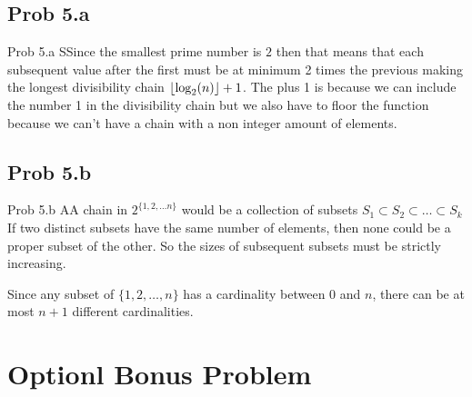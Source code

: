 \documentclass{report}
\begin{document}

\subsection*{Prob 5.a}

\begin{RemarkWithLily}{Prob 5.a }
  SSince the smallest prime number is $2$ then that means that each subsequent value after the first must be at minimum 2 times the previous making the longest divisibility chain 
  $\lfloor\log_{2}(n)\rfloor +1$. The plus 1 is because we can include the number 1 in the divisibility chain but we also have to floor the function because we can't have a chain with a non integer amount of elements.  
\end{RemarkWithLily}

\subsection*{Prob 5.b}

\begin{RemarkWithLily}{Prob 5.b}
  AA chain in $2^{\{1, 2, \ldots n\}}$ would be a collection of subsets $S_{1} \subset S_{2} \subset \ldots \subset  S_{k}$
  If two distinct subsets have the same number of elements, then none could be a proper subset of the other. So the sizes of subsequent subsets must be strictly increasing.  

  \bigskip 
  Since any subset of $\{1,2,\dots,n\}$ has a cardinality between $0$ and $n$, there can be at most $n+1$ different cardinalities. 
  
\end{RemarkWithLily}

\newpage 

\section*{Optionl Bonus Problem}
\end{document}
